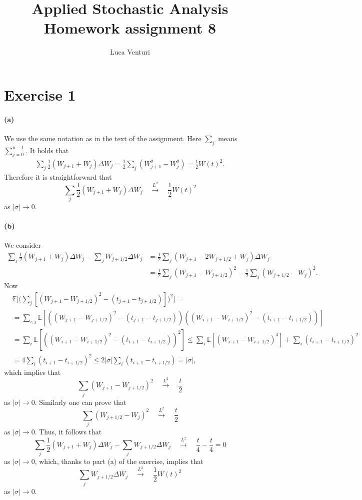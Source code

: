 \documentclass[a4paper,11pt]{article}
\theoremstyle{definition}
\theoremstyle{plain}
\theoremstyle{remark}
\begin{document}
\title{Applied Stochastic Analysis \\ Homework assignment 8}
\author{Luca Venturi}
\maketitle

\section*{Exercise 1}

\paragraph*{(a)}

We use the same notation as in the text of the assignment. Here $\sum_j$ means $\sum_{j=0}^{n-1}$. It holds that
\begin{align*}
\sum_j\frac{1}{2}(W_{j+1}+W_j)\Delta W_j = \frac{1}{2}\sum_j(W_{j+1}^2-W_j^2) = \frac{1}{2}W(t)^2.
\end{align*}
Therefore it is straightforward that 
$$
\sum_j\frac{1}{2}(W_{j+1}+W_j)\Delta W_j \quad\xrightarrow{L^2}\quad \frac{1}{2}W(t)^2
$$
as $|\sigma|\to0$.

\paragraph*{(b)}

We consider 
\begin{align*}
\sum_j\frac{1}{2}(W_{j+1}+W_j)\Delta W_j - \sum_jW_{j+1/2}\Delta W_j & = \frac{1}{2}\sum_j(W_{j+1}-2W_{j+1/2}+W_j)\Delta W_j \\ & = \frac{1}{2}\sum_j(W_{j+1}-W_{j+1/2})^2 -\frac{1}{2}\sum_j(W_{j+1/2}-W_j)^2.
\end{align*}
Now 
\begin{align*}
& \mathbb{E}\Big[\Big(\sum_j[(W_{j+1}-W_{j+1/2})^2-(t_{j+1}-t_{j+1/2})]\Big)^2\Big] = \\ & = \sum_{i,j}\mathbb{E}[((W_{j+1}-W_{j+1/2})^2-(t_{j+1}-t_{j+1/2}))((W_{i+1}-W_{i+1/2})^2-(t_{i+1}-t_{i+1/2}))] \\ & = \sum_i \mathbb{E}[((W_{i+1}-W_{i+1/2})^2-(t_{i+1}-t_{i+1/2}))^2] \leq \sum_i \mathbb{E}[(W_{i+1}-W_{i+1/2})^4] + \sum_i(t_{i+1}-t_{i+1/2})^2 \\ & = 4 \sum_i(t_{i+1}-t_{i+1/2})^2 \leq 2 |\sigma| \sum_i(t_{i+1}-t_{i+1/2}) = |\sigma|,
\end{align*}
which implies that 
$$
\sum_j(W_{j+1}-W_{j+1/2})^2 \quad\xrightarrow{L^2}\quad \frac{t}{2}
$$
as $|\sigma|\to0$.
Similarly one can prove that
$$
\sum_j(W_{j+1/2}-W_j)^2 \quad\xrightarrow{L^2}\quad \frac{t}{2}
$$
as $|\sigma|\to0$.
Thus, it follows that
$$
\sum_j\frac{1}{2}(W_{j+1}+W_j)\Delta W_j - \sum_jW_{j+1/2}\Delta W_j \quad\xrightarrow{L^2}\quad \frac{t}{4} - \frac{t}{4} = 0
$$
as $|\sigma|\to0$, which, thanks to part (a) of the exercise, implies that
$$
\sum_jW_{j+1/2}\Delta W_j \quad\xrightarrow{L^2}\quad \frac{1}{2}W(t)^2
$$
as $|\sigma|\to0$.
\end{document}
